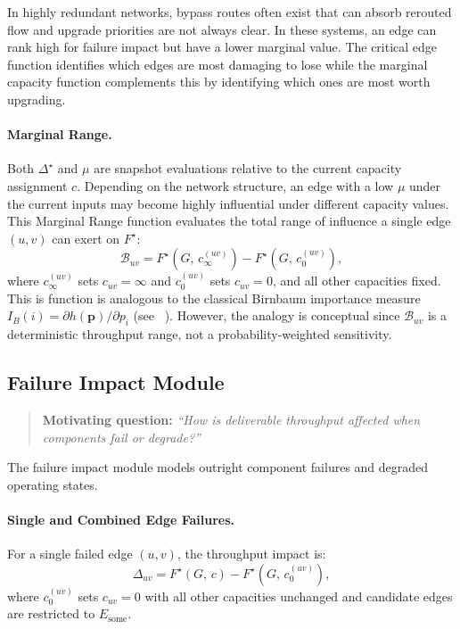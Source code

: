 \documentclass[12pt]{report}
\begin{document}
In highly redundant networks, bypass routes often exist that can absorb rerouted flow and upgrade priorities are not always clear. In these systems, an edge can rank high for failure impact but have a lower marginal value. The critical edge function identifies which edges are most damaging to lose while the marginal capacity function complements this by identifying which ones are most worth upgrading.

\paragraph{Marginal Range.}
Both $\Delta^\star$ and $\mu$ are snapshot evaluations relative to the current capacity assignment $c$. Depending on the network structure, an edge with a low $\mu$ under the current inputs may become highly influential under different capacity values. This Marginal Range function evaluates the total range of influence a single edge $(u,v)$ can exert on $F^\star$:
\[
\mathcal{B}_{uv} = F^\star\!\left(G,\, c^{(uv)}_\infty\right) 
- F^\star\!\left(G,\, c^{(uv)}_0\right),
\]
where $c^{(uv)}_\infty$ sets $c_{uv} = \infty$ and $c^{(uv)}_0$ sets $c_{uv} = 0$, and all other capacities fixed. This is function is analogous to the classical Birnbaum importance measure 
$I_B(i) = \partial h(\mathbf{p})/\partial p_i$ (see ~\cite{birnbaum1969}). However, the analogy is conceptual since $\mathcal{B}_{uv}$ is a deterministic throughput range, not a probability-weighted sensitivity.


\subsection{Failure Impact Module}
\begin{quote}
    \textbf{Motivating question:} 
    \textit{``How is deliverable throughput affected when components fail or degrade?''}
\end{quote}
The failure impact module models outright component failures and degraded operating states. 

\paragraph{Single and Combined Edge Failures.}
For a single failed edge $(u,v)$, the throughput impact is:
\[
\Delta_{uv} = F^\star(G,\, c) - F^\star\!\left(G,\, 
c^{(uv)}_0\right),
\]
where $c^{(uv)}_0$ sets $c_{uv} = 0$ with all other capacities unchanged and candidate edges are restricted to $E_{\text{some}}$.
\end{document}
